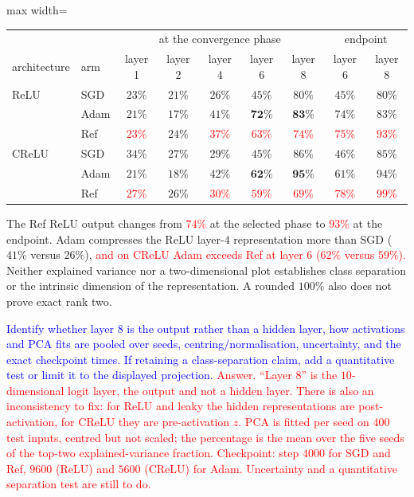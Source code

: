 \documentclass{article}
\newcommand{\zied}[1]{\textcolor{blue}{#1}}
\newcommand{\nat}[1]{\textcolor{red}{#1}}
\theoremstyle{definition}
\theoremstyle{remark}
\begin{document}
\begin{center}\small
\begin{adjustbox}{max width=\linewidth}
\begin{tabular}{llccccc|cc}
\toprule
 & & \multicolumn{5}{c|}{at the convergence phase} & \multicolumn{2}{c}{endpoint} \\
architecture & arm & layer 1 & layer 2 & layer 4 & layer 6 & layer 8 & layer 6 & layer 8 \\
\midrule
ReLU  & SGD & $23\%$ & $21\%$ & $26\%$ & $45\%$ & $80\%$ & $45\%$ & $80\%$ \\
      & Adam             & $21\%$ & $17\%$ & $41\%$ & $\mathbf{72\%}$ & $\mathbf{83\%}$ & $74\%$ & $83\%$ \\
      & Ref        & \nat{$23\%$} & $24\%$ & \nat{$37\%$} & \nat{$63\%$} & \nat{$74\%$} & \nat{$75\%$} & \nat{$93\%$} \\
\midrule
CReLU & SGD & $34\%$ & $27\%$ & $29\%$ & $45\%$ & $86\%$ & $46\%$ & $85\%$ \\
      & Adam             & $21\%$ & $18\%$ & $42\%$ & $\mathbf{62\%}$ & $\mathbf{95\%}$ & $61\%$ & $94\%$ \\
      & Ref        & \nat{$27\%$} & $26\%$ & \nat{$30\%$} & \nat{$59\%$} & \nat{$69\%$} & \nat{$78\%$} & \nat{$99\%$} \\
\bottomrule
\end{tabular}
\end{adjustbox}
\end{center}

The Ref ReLU output changes from \nat{$74\%$} at the selected phase to \nat{$93\%$} at the endpoint. Adam compresses the ReLU layer-$4$ representation more than SGD ($41\%$ versus $26\%$), \nat{and on CReLU Adam exceeds Ref at layer $6$ ($62\%$ versus $59\%$).} Neither explained variance nor a two-dimensional plot establishes class separation or the intrinsic dimension of the representation. A rounded $100\%$ also does not prove exact rank two.

\zied{Identify whether layer 8 is the output rather than a hidden layer, how activations and PCA fits are pooled over seeds, centring/normalisation, uncertainty, and the exact checkpoint times. If retaining a class-separation claim, add a quantitative test or limit it to the displayed projection.}
\nat{Answer. ``Layer $8$'' is the $10$-dimensional logit layer, the output and not a hidden layer. There is also an inconsistency to fix: for ReLU and leaky the hidden representations are post-activation, for CReLU they are pre-activation $z$. PCA is fitted per seed on $400$ test inputs, centred but not scaled; the percentage is the mean over the five seeds of the top-two explained-variance fraction. Checkpoint: step $4000$ for SGD and Ref, $9600$ (ReLU) and $5600$ (CReLU) for Adam. Uncertainty and a quantitative separation test are still to do.}
\end{document}
